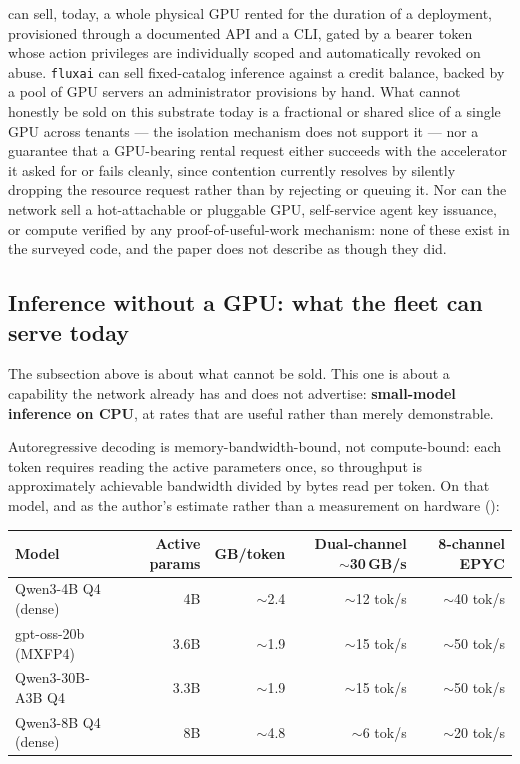 \FluxEdge can sell, today, a whole physical GPU rented for the duration of a deployment, provisioned
through a documented API and a CLI, gated by a bearer token whose action privileges are individually
scoped and automatically revoked on abuse. \texttt{fluxai} can sell fixed-catalog inference against a
credit balance, backed by a pool of GPU servers an administrator provisions by hand. What cannot
honestly be sold on this substrate today is a fractional or shared slice of a single GPU across
tenants — the isolation mechanism does not support it — nor a guarantee that a GPU-bearing rental
request either succeeds with the accelerator it asked for or fails cleanly, since contention
currently resolves by silently dropping the resource request rather than by rejecting or queuing it.
Nor can the network sell a hot-attachable or pluggable GPU, self-service agent key issuance, or
compute verified by any proof-of-useful-work mechanism: none of these exist in the surveyed code, and
the paper does not describe \Flux as though they did.

\subsection{Inference without a GPU: what the fleet can serve today}
\label{sec:cpu-inference}

The subsection above is about what cannot be sold. This one is about a capability the network already
has and does not advertise: \textbf{small-model inference on CPU}, at rates that are useful rather
than merely demonstrable.

Autoregressive decoding is memory-bandwidth-bound, not compute-bound: each token requires reading the
active parameters once, so throughput is approximately achievable bandwidth divided by bytes read per
token. On that model, and as the author's estimate rather than a measurement on \Flux{} hardware
 (\planned):

\begin{center}
\small
\begin{tabular}{@{}lrrrr@{}}
\toprule
\textbf{Model} & \textbf{Active params} & \textbf{GB/token} & \textbf{Dual-channel $\sim$30\,GB/s} & \textbf{8-channel EPYC} \\
\midrule
Qwen3-4B Q4 (dense)  & 4B   & $\sim$2.4 & $\sim$12 tok/s & $\sim$40 tok/s \\
gpt-oss-20b (MXFP4)  & 3.6B & $\sim$1.9 & $\sim$15 tok/s & $\sim$50 tok/s \\
Qwen3-30B-A3B Q4     & 3.3B & $\sim$1.9 & $\sim$15 tok/s & $\sim$50 tok/s \\
Qwen3-8B Q4 (dense)  & 8B   & $\sim$4.8 & $\sim$6 tok/s  & $\sim$20 tok/s \\
\bottomrule
\end{tabular}
\end{center}

